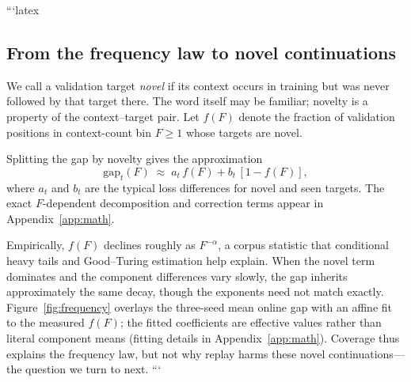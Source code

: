 ```latex
\subsection{From the frequency law to novel continuations}
\label{sec:novel-continuations}

We call a validation target \emph{novel} if its context occurs in training but was never followed by that target there. The word itself may be familiar; novelty is a property of the context--target pair. Let $f(F)$ denote the fraction of validation positions in context-count bin $F \ge 1$ whose targets are novel.

Splitting the gap by novelty gives the approximation
\begin{equation}
\mathrm{gap}_t(F) \;\approx\; a_t\, f(F) + b_t\,[1 - f(F)],
\label{eq:coverage-main}
\end{equation}
where $a_t$ and $b_t$ are the typical loss differences for novel and seen targets. The exact $F$-dependent decomposition and correction terms appear in Appendix~\ref{app:math}.

Empirically, $f(F)$ declines roughly as $F^{-\alpha}$, a corpus statistic that conditional heavy tails and Good--Turing estimation help explain. When the novel term dominates and the component differences vary slowly, the gap inherits approximately the same decay, though the exponents need not match exactly. Figure~\ref{fig:frequency} overlays the three-seed mean online gap with an affine fit to the measured $f(F)$; the fitted coefficients are effective values rather than literal component means (fitting details in Appendix~\ref{app:math}). Coverage thus explains the frequency law, but not why replay harms these novel continuations---the question we turn to next.
```